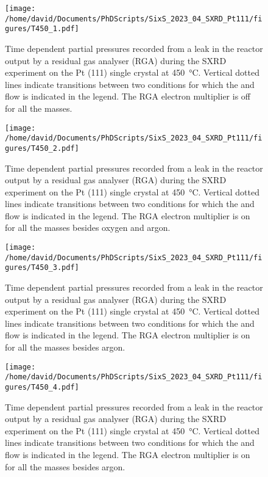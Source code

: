 \begin{figure}[!htb]
    \centering
    \texttt{[image: /home/david/Documents/PhDScripts/SixS\_2023\_04\_SXRD\_Pt111/figures/T450\_1.pdf]}
    \caption{
        Time dependent partial pressures recorded from a leak in the reactor output by a residual gas analyser (RGA) during the SXRD experiment on the Pt (111) single crystal at \qty{450}{\degreeCelsius}.
        Vertical dotted lines indicate transitions between two conditions for which the  and  flow is indicated in the legend.
        The RGA electron multiplier is off for all the masses.
    }
    \label{fig:RGA450Pt111_1}
\end{figure}

\begin{figure}[!htb]
    \centering
    \texttt{[image: /home/david/Documents/PhDScripts/SixS\_2023\_04\_SXRD\_Pt111/figures/T450\_2.pdf]}
    \caption{
        Time dependent partial pressures recorded from a leak in the reactor output by a residual gas analyser (RGA) during the SXRD experiment on the Pt (111) single crystal at \qty{450}{\degreeCelsius}.
        Vertical dotted lines indicate transitions between two conditions for which the  and  flow is indicated in the legend.
        The RGA electron multiplier is on for all the masses besides oxygen and argon.
    }
    \label{fig:RGA450Pt111_2}
\end{figure}

\begin{figure}[!htb]
    \centering
    \texttt{[image: /home/david/Documents/PhDScripts/SixS\_2023\_04\_SXRD\_Pt111/figures/T450\_3.pdf]}
    \caption{
        Time dependent partial pressures recorded from a leak in the reactor output by a residual gas analyser (RGA) during the SXRD experiment on the Pt (111) single crystal at \qty{450}{\degreeCelsius}.
        Vertical dotted lines indicate transitions between two conditions for which the  and  flow is indicated in the legend.
        The RGA electron multiplier is on for all the masses besides argon.
    }
    \label{fig:RGA450Pt111_3}
\end{figure}

\begin{figure}[!htb]
    \centering
    \texttt{[image: /home/david/Documents/PhDScripts/SixS\_2023\_04\_SXRD\_Pt111/figures/T450\_4.pdf]}
    \caption{
        Time dependent partial pressures recorded from a leak in the reactor output by a residual gas analyser (RGA) during the SXRD experiment on the Pt (111) single crystal at \qty{450}{\degreeCelsius}.
        Vertical dotted lines indicate transitions between two conditions for which the  and  flow is indicated in the legend.
        The RGA electron multiplier is on for all the masses besides argon.
    }
    \label{fig:RGA450Pt111_4}
\end{figure}